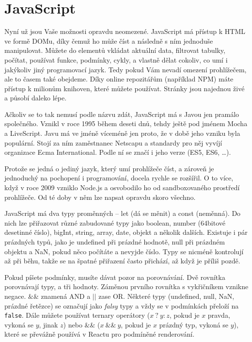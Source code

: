 \section{JavaScript}

Nyní už jsou Vaše možnosti opravdu neomezené. JavaScript má přístup k HTML ve formě DOMu\cite{DOMIntroduction}\cite{JSDom}, díky čemuž ho může číst a následně s ním jednoduše manipulovat. Můžete do elementů vkládat aktuální data, filtrovat tabulky, počítat, používat funkce, podmínky, cykly, a vlastně dělat cokoliv, co umí i jakýkoliv jiný programovací jazyk. Tedy pokud Vám nevadí omezení prohlížečem, ale to časem také obejdeme. Díky online repozitářům (například NPM) máte přístup k milionům knihoven, které můžete používat. Stránky jsou najednou živé a působí daleko lépe.

Ačkoliv se to tak nemusí podle názvu zdát, JavaScript má s Javou jen pramálo společného. Vznikl v roce 1995 během deseti dnů, tehdy ještě pod jménem Mocha a LiveScript. Javu má ve jméně víceméně jen proto, že v době jeho vzniku byla populární. Stojí za ním zaměstnanec Netscapu a standardy pro něj vyvíjí organizace Ecma International. Podle ní se značí i jeho verze (ES5, ES6, \ldots).\cite{JSIntroduction}\cite{JSOrigins}\cite{JSHistory}

Protože se jedná o jediný jazyk, který umí prohlížeče číst, a zároveň je jednoduchý na pochopení i programování, docela rychle se rozšířil. O to více, když v roce 2009 vzniklo Node.js a osvobodilo ho od sandboxovaného prostředí prohlížeče. Od té doby v něm lze napsat opravdu skoro všechno.

JavaScript má dva typy proměnných – let (dá se měnit) a const (neměnná). Do nich lze přiřazovat různé zabudované typy jako boolean, number (64bitové desetinné číslo), bigInt, string, array, date, objekt a několik dalších. Existuje i pár prázdných typů, jako je undefined při prázdné hodnotě, null při prázdném objektu a NaN, pokud něco počítáte a nevyjde číslo. Typy se nicméně kontrolují až při běhu, takže se na špatné přiřazení často přichází, až když je příliš pozdě.\cite{JSBasics}\cite{JSTypes}

Pokud píšete podmínky, musíte dávat pozor na porovnávání. Dvě rovnítka porovnávají typy, a tři hodnoty. Záměnou prvního rovnítka s vykřičníkem vznikne negace. $\&\&$ znamená AND a $||$ zase OR. Některé typy (undefined, null, NaN, prázdné řetězce) se označují jako \textit{falsy} typy a vždy se v podmínkách přeloží na \texttt{false}. Dále můžete používat ternary operátory ($x\ ?\ y : z$, pokud je $x$ pravda, vykoná se $y$, jinak $z$) nebo $\&\&$ ($x\ \&\&\ y$, pokud je $x$ prázdný typ, vykoná se $y$), které se převážně používá v Reactu pro podmíněné renderování.

